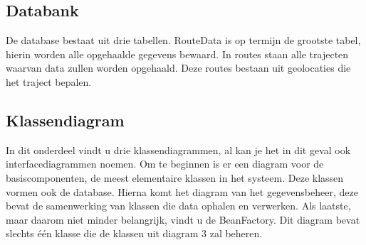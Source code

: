 \documentclass[ps,a4paper,oneside]{report}
\begin{document}
\subsection{Databank}
De database bestaat uit drie tabellen. RouteData is op termijn de grootste tabel, hierin worden alle opgehaalde gegevens bewaard. In routes staan alle trajecten waarvan data zullen worden opgehaald. Deze routes bestaan uit geolocaties die het traject bepalen.
\subsection{Klassendiagram}
In dit onderdeel vindt u drie klassendiagrammen, al kan je het in dit geval ook interfacediagrammen noemen. Om te beginnen is er een diagram voor de basiscomponenten, de meest elementaire klassen in het systeem. Deze klassen vormen ook de database. Hierna komt het diagram van het gegevensbeheer, deze bevat de samenwerking van klassen die data ophalen en verwerken. Als laatste, maar daarom niet minder belangrijk, vindt u de BeanFactory. Dit diagram bevat slechts \'e\'en klasse die de klassen uit diagram 3 zal beheren.
\end{document}
